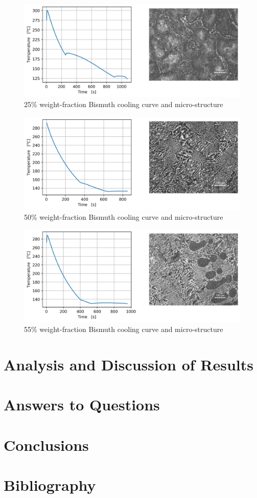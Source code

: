 \documentclass{article}
\begin{document}
\begin{figure}
    \centering
    \includegraphics[width=1\linewidth]{plots/q2_25.png}
    \caption{25\% weight-fraction Bismuth cooling curve and micro-structure}
    \label{fig:q2-25}
\end{figure}

\begin{figure}
    \centering
    \includegraphics[width=1\linewidth]{plots/q2_50.png}
    \caption{50\% weight-fraction Bismuth cooling curve and micro-structure}
    \label{fig:q2-50}
\end{figure}

\begin{figure}
    \centering
    \includegraphics[width=1\linewidth]{plots/q2_55.png}
    \caption{55\% weight-fraction Bismuth cooling curve and micro-structure}
    \label{fig:q2-55}
\end{figure}




\section{Analysis and Discussion of Results}

\section{Answers to Questions}

\section{Conclusions}

\section{Bibliography}
\end{document}
